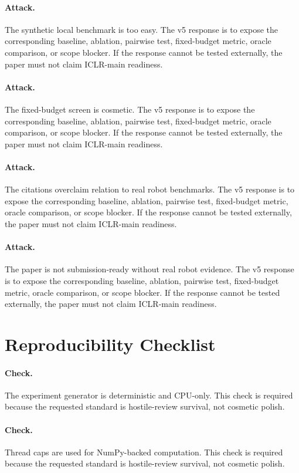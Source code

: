 \documentclass{article}
\begin{document}
\paragraph{Attack.} The synthetic local benchmark is too easy. The v5 response is to expose the corresponding baseline, ablation, pairwise test, fixed-budget metric, oracle comparison, or scope blocker. If the response cannot be tested externally, the paper must not claim ICLR-main readiness.
\paragraph{Attack.} The fixed-budget screen is cosmetic. The v5 response is to expose the corresponding baseline, ablation, pairwise test, fixed-budget metric, oracle comparison, or scope blocker. If the response cannot be tested externally, the paper must not claim ICLR-main readiness.
\paragraph{Attack.} The citations overclaim relation to real robot benchmarks. The v5 response is to expose the corresponding baseline, ablation, pairwise test, fixed-budget metric, oracle comparison, or scope blocker. If the response cannot be tested externally, the paper must not claim ICLR-main readiness.
\paragraph{Attack.} The paper is not submission-ready without real robot evidence. The v5 response is to expose the corresponding baseline, ablation, pairwise test, fixed-budget metric, oracle comparison, or scope blocker. If the response cannot be tested externally, the paper must not claim ICLR-main readiness.
\clearpage
\section{Reproducibility Checklist}
\paragraph{Check.} The experiment generator is deterministic and CPU-only. This check is required because the requested standard is hostile-review survival, not cosmetic polish.
\paragraph{Check.} Thread caps are used for NumPy-backed computation. This check is required because the requested standard is hostile-review survival, not cosmetic polish.
\end{document}
